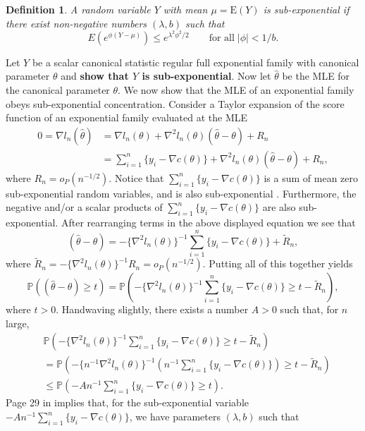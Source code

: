 \documentclass[12pt]{article}
\newcommand{\Prob}{\mathbb{P}}
\newcommand{\E}{\mathrm{E}}
\DeclareMathOperator{\E}{E}
\newtheorem{defn}{Definition}
\begin{document}
\begin{defn}
A random variable $Y$ with mean $\mu = \E(Y)$ is \emph{sub-exponential} if there exist non-negative numbers $(\lambda,b)$ such that 
$$
  E\left(e^{\phi(Y - \mu)}\right) \leq e^{\lambda^2\phi^2/2} 
    \qquad \text{for all} \; |\phi| < 1/b.
$$	
\end{defn}


Let $Y$ be a scalar canonical statistic regular full exponential family with canonical parameter $\theta$ and \textbf{show that $Y$ is sub-exponential}. Now let $\hat\theta$ be the MLE for the canonical parameter $\theta$. We now show that the MLE of an exponential family obeys sub-exponential concentration. Consider a Taylor expansion of the score function of an exponential family evaluated at the MLE
\begin{align*}
  0 = \nabla l_n(\hat\theta) &= \nabla l_n(\theta) 
    + \nabla^2l_n(\theta)(\hat\theta - \theta) + R_n	\\
    &= \sum_{i=1}^n\{y_i - \nabla c(\theta)\} + \nabla^2l_n(\theta)(\hat\theta - \theta) + R_n,
\end{align*}
where $R_n = o_P(n^{-1/2})$. Notice that $\sum_{i=1}^n\{y_i - \nabla c(\theta)\}$ is a sum of mean zero sub-exponential random variables, and is also sub-exponential \citep[Chapter 2]{wainwright2019high}. Furthermore, the negative and/or a scalar products of $\sum_{i=1}^n\{y_i - \nabla c(\theta)\}$ are also sub-exponential. After rearranging terms in the above displayed equation we see that 
$$
  (\hat\theta - \theta) = -\{\nabla^2 l_n(\theta)\}^{-1}\sum_{i=1}^n\{y_i - \nabla c(\theta)\} + \widetilde R_n,
$$
where $\widetilde R_n = -\{\nabla^2l_n(\theta)\}^{-1}R_n = o_P(n^{-1/2})$. Putting all of this together yields
$$
  \Prob\left( (\hat\theta - \theta) \geq t\right) 
  = \Prob\left( -\{\nabla^2l_n(\theta)\}^{-1}\sum_{i=1}^n\{y_i - \nabla c(\theta)\} \geq t - \widetilde R_n\right),
$$
where $t > 0$. Handwaving slightly, there exists a number $A > 0$ such that, for $n$ large, 
\begin{align*}
  &\Prob\left( -\{\nabla^2l_n(\theta)\}^{-1}\sum_{i=1}^n\{y_i - \nabla c(\theta)\} \geq t - \widetilde R_n \right) \\
  &= \Prob\left( -\{n^{-1}\nabla^2l_n(\theta)\}^{-1}\left(n^{-1}\sum_{i=1}^n\{y_i - \nabla c(\theta)\}\right) \geq t - \widetilde R_n\right) \\
  &\leq \Prob\left( -An^{-1}\sum_{i=1}^n\{y_i - \nabla c(\theta)\} \geq t\right).
\end{align*}
Page 29 in \cite{wainwright2019high} implies that, for the sub-exponential variable $-An^{-1}\sum_{i=1}^n\{y_i - \nabla c(\theta)\}$, we have parameters $(\lambda,b)$ such that
\end{document}
